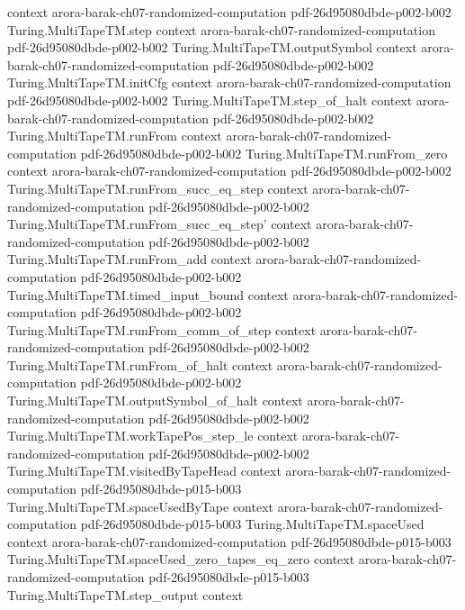 \begin{theorem}
  {context}
  {arora-barak-ch07-randomized-computation}
  {pdf-26d95080dbde-p002-b002}
\proofstep
  {Turing.MultiTapeTM.step}
  {context}
  {arora-barak-ch07-randomized-computation}
  {pdf-26d95080dbde-p002-b002}
\proofstep
  {Turing.MultiTapeTM.outputSymbol}
  {context}
  {arora-barak-ch07-randomized-computation}
  {pdf-26d95080dbde-p002-b002}
\proofstep
  {Turing.MultiTapeTM.initCfg}
  {context}
  {arora-barak-ch07-randomized-computation}
  {pdf-26d95080dbde-p002-b002}
\proofstep
  {Turing.MultiTapeTM.step_of_halt}
  {context}
  {arora-barak-ch07-randomized-computation}
  {pdf-26d95080dbde-p002-b002}
\proofstep
  {Turing.MultiTapeTM.runFrom}
  {context}
  {arora-barak-ch07-randomized-computation}
  {pdf-26d95080dbde-p002-b002}
\proofstep
  {Turing.MultiTapeTM.runFrom_zero}
  {context}
  {arora-barak-ch07-randomized-computation}
  {pdf-26d95080dbde-p002-b002}
\proofstep
  {Turing.MultiTapeTM.runFrom_succ_eq_step}
  {context}
  {arora-barak-ch07-randomized-computation}
  {pdf-26d95080dbde-p002-b002}
\proofstep
  {Turing.MultiTapeTM.runFrom_succ_eq_step'}
  {context}
  {arora-barak-ch07-randomized-computation}
  {pdf-26d95080dbde-p002-b002}
\proofstep
  {Turing.MultiTapeTM.runFrom_add}
  {context}
  {arora-barak-ch07-randomized-computation}
  {pdf-26d95080dbde-p002-b002}
\proofstep
  {Turing.MultiTapeTM.timed_input_bound}
  {context}
  {arora-barak-ch07-randomized-computation}
  {pdf-26d95080dbde-p002-b002}
\proofstep
  {Turing.MultiTapeTM.runFrom_comm_of_step}
  {context}
  {arora-barak-ch07-randomized-computation}
  {pdf-26d95080dbde-p002-b002}
\proofstep
  {Turing.MultiTapeTM.runFrom_of_halt}
  {context}
  {arora-barak-ch07-randomized-computation}
  {pdf-26d95080dbde-p002-b002}
\proofstep
  {Turing.MultiTapeTM.outputSymbol_of_halt}
  {context}
  {arora-barak-ch07-randomized-computation}
  {pdf-26d95080dbde-p002-b002}
\proofstep
  {Turing.MultiTapeTM.workTapePos_step_le}
  {context}
  {arora-barak-ch07-randomized-computation}
  {pdf-26d95080dbde-p002-b002}
\proofstep
  {Turing.MultiTapeTM.visitedByTapeHead}
  {context}
  {arora-barak-ch07-randomized-computation}
  {pdf-26d95080dbde-p015-b003}
\proofstep
  {Turing.MultiTapeTM.spaceUsedByTape}
  {context}
  {arora-barak-ch07-randomized-computation}
  {pdf-26d95080dbde-p015-b003}
\proofstep
  {Turing.MultiTapeTM.spaceUsed}
  {context}
  {arora-barak-ch07-randomized-computation}
  {pdf-26d95080dbde-p015-b003}
\proofstep
  {Turing.MultiTapeTM.spaceUsed_zero_tapes_eq_zero}
  {context}
  {arora-barak-ch07-randomized-computation}
  {pdf-26d95080dbde-p015-b003}
\proofstep
  {Turing.MultiTapeTM.step_output}
  {context}

\end{theorem}
